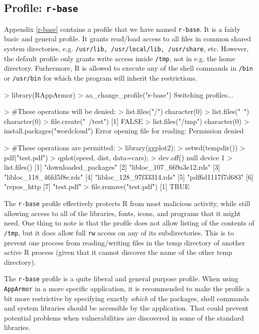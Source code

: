 \documentclass[article]{jss}
\newcommand{\R}{\textsf{R}\xspace}
\newcommand{\AppArmor}{\texttt{AppArmor}\xspace}
\begin{document}
\subsection[Profile: r-base]{Profile: \texttt{r-base}}
\label{r-base-intro}

Appendix \ref{r-base} contains a profile that we have named \texttt{r-base}.
It is a fairly basic and general profile. It grants read/load access to all
files in common shared system directories, e.g. \texttt{/usr/lib,
/usr/local/lib, /usr/share}, etc. However, the default profile only grants
write access inside \texttt{/tmp}, not in e.g. the home directory. Furhermore,
\R is allowed to execute any of the shell commands in \texttt{/bin}
or \texttt{/usr/bin} for which the program will inherit the restrictions.

\begin{CodeChunk}
\begin{CodeInput}
> library(RAppArmor)
> aa_change_profile("r-base")
Switching profiles...

> #These operations will be denied:
> list.files("/")
character(0)
> list.files("~")
character(0)
> file.create("~/test")
[1] FALSE
> list.files("/tmp")
character(0)
> install.packages("wordcloud")
Error opening file for reading: Permission denied

> #These operations are permitted:
> library(ggplot2);
> setwd(tempdir())
> pdf("test.pdf")
> qplot(speed, dist, data=cars);
> dev.off()
null device
          1
> list.files()
[1] "downloaded_packages"
[2] "libloc_107_669a3e12.rds"
[3] "libloc_118_46fd5f8e.rds"
[4] "libloc_128_97f33314.rds"
[5] "pdf6d1117f7d683"
[6] "repos_http%
[7] "test.pdf"
> file.remove("test.pdf")
[1] TRUE
\end{CodeInput}
\end{CodeChunk}

The \texttt{r-base} profile effectively protects \R from most malicious
activity, while still allowing access to all of the libraries, fonts, icons, and
programs that it might need. One thing to note is that the profile
does not allow listing of the contents of \texttt{/tmp}, but it does allow full
\texttt{rw} access on any of its subdirectories. This is to prevent one process
from reading/writing files in the temp directory of another active \R process
(given that it cannot discover the name of the other temp directory).

The \texttt{r-base} profile is a quite liberal and general purpose profile. When
using \AppArmor in a more specific application, it is recommended to make the
profile a bit more restrictive by specifying exactly \emph{which} of the
packages, shell commands and system libraries should be accessible by the
application. That could prevent potential problems when vulnerabilities are
discovered in some of the standard libraries.
\end{document}
